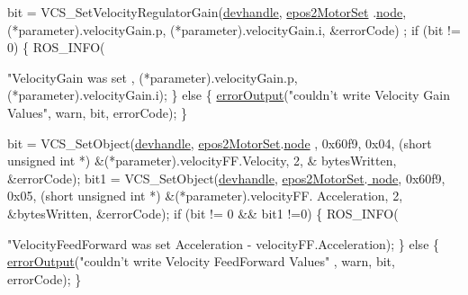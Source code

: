 \begin{DoxyCode}
{{        bit = VCS\_SetVelocityRegulatorGain(\hyperlink{classEpos2MotorController_a40594faab444bcba221ab9d55d1162cd}{devhandle}, \hyperlink{classEpos2MotorController_a0856f5fdd71ffa3b84a536afa085bfb1}{epos2MotorSet}
      .\hyperlink{structEpos2MotorController_1_1epos2Settings_ab8f18d3df17e8de9ed5250a3e53292c6}{node}, (*parameter).velocityGain.p, (*parameter).velocityGain.i, &errorCode)
      ;
        \textcolor{keywordflow}{if} (bit != 0) \{
            ROS\_INFO(\textcolor{stringliteral}{"VelocityGain was set %
      , (*parameter).velocityGain.p, (*parameter).velocityGain.i);
        \} \textcolor{keywordflow}{else} \{
            \hyperlink{classEpos2MotorController_a64d5e3e3858597c111e60ba8b382a63b}{errorOutput}(\textcolor{stringliteral}{"couldn't write Velocity Gain Values"}, warn,
       bit, errorCode);
        \}

        bit = VCS\_SetObject(\hyperlink{classEpos2MotorController_a40594faab444bcba221ab9d55d1162cd}{devhandle}, \hyperlink{classEpos2MotorController_a0856f5fdd71ffa3b84a536afa085bfb1}{epos2MotorSet}.\hyperlink{structEpos2MotorController_1_1epos2Settings_ab8f18d3df17e8de9ed5250a3e53292c6}{node}
      , 0x60f9, 0x04, (\textcolor{keywordtype}{short} \textcolor{keywordtype}{unsigned} \textcolor{keywordtype}{int} *) &(*parameter).velocityFF.Velocity, 2, &
      bytesWritten, &errorCode);
        bit1 = VCS\_SetObject(\hyperlink{classEpos2MotorController_a40594faab444bcba221ab9d55d1162cd}{devhandle}, \hyperlink{classEpos2MotorController_a0856f5fdd71ffa3b84a536afa085bfb1}{epos2MotorSet}.\hyperlink{structEpos2MotorController_1_1epos2Settings_ab8f18d3df17e8de9ed5250a3e53292c6}{
      node}, 0x60f9, 0x05, (\textcolor{keywordtype}{short} \textcolor{keywordtype}{unsigned} \textcolor{keywordtype}{int} *) &(*parameter).velocityFF.
      Acceleration, 2, &bytesWritten, &errorCode);
        \textcolor{keywordflow}{if} (bit != 0 && bit1 !=0) \{
            ROS\_INFO(\textcolor{stringliteral}{"VelocityFeedForward was set %
       Acceleration - %
      velocityFF.Acceleration);
        \} \textcolor{keywordflow}{else} \{
            \hyperlink{classEpos2MotorController_a64d5e3e3858597c111e60ba8b382a63b}{errorOutput}(\textcolor{stringliteral}{"couldn't write Velocity FeedForward Values"}
      , warn, bit, errorCode);
        \}

}}}}
\end{DoxyCode}
